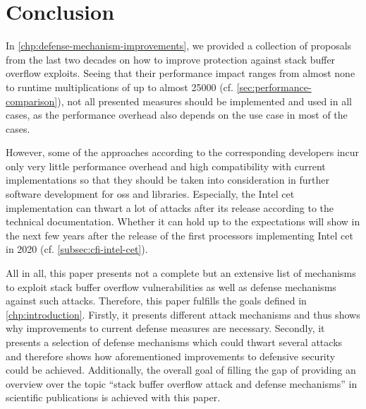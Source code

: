 \chapter{Conclusion}
\label{chp:conclusion}

In \cref{chp:defense-mechanism-improvements}, we provided a collection of proposals from the last two decades on how to improve protection against stack buffer overflow exploits.
Seeing that their performance impact ranges from almost none to runtime multiplications of up to almost 25000 (cf. \cref{sec:performance-comparison}), not all presented measures should be implemented and used in all cases, as the performance overhead also depends on the use case in most of the cases.

However, some of the approaches according to the corresponding developers incur only very little performance overhead and high compatibility with current implementations so that they should be taken into consideration in further software development for \glspl{os} and libraries.
Especially, the Intel \gls{cet} implementation can thwart a lot of attacks after its release according to the technical documentation.
Whether it can hold up to the expectations will show in the next few years after the release of the first processors implementing Intel \gls{cet} in 2020 (cf. \cref{subsec:cfi-intel-cet}).

All in all, this paper presents not a complete but an extensive list of mechanisms to exploit stack buffer overflow vulnerabilities as well as defense mechanisms against such attacks.
Therefore, this paper fulfills the goals defined in \cref{chp:introduction}.
Firstly, it presents different attack mechanisms and thus shows why improvements to current defense measures are necessary.
Secondly, it presents a selection of defense mechanisms which could thwart several attacks and therefore shows how aforementioned improvements to defensive security could be achieved.
Additionally, the overall goal of filling the gap of providing an overview over the topic ``stack buffer overflow attack and defense mechanisms'' in scientific publications is achieved with this paper.